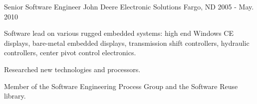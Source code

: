 \begin{cventries}
  \cventry
    {Senior Software Engineer} %
    {John Deere Electronic Solutions} %
    {Fargo, ND} %
    {2005 - May. 2010} %
    {
      \begin{cvitems} %
        \item {Software lead on various rugged embedded systems: high end Windows CE displays, bare-metal embedded displays, transmission shift controllers, hydraulic controllers, center pivot control electronics.}
        \item {Researched new technologies and processors.}
        \item {Member of the Software Engineering Process Group and the Software Reuse library.}
      \end{cvitems}
    }

\end{cventries}
